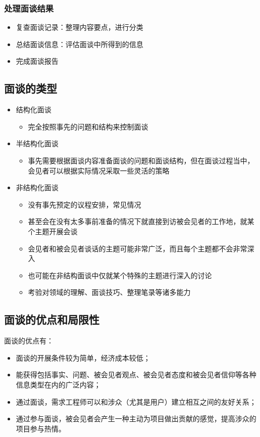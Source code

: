 \subsubsection{处理面谈结果}
\vspace{-0.8em}
\begin{multicols}{2}
    \begin{itemize}
        \item 复查面谈记录：整理内容要点，进行分类 
        \item 总结面谈信息：评估面谈中所得到的信息 
        \item 完成面谈报告
    \end{itemize}
\end{multicols}
\vspace{-1em}

\subsection{面谈的类型}
\begin{itemize}
    \item 结构化面谈
    \begin{itemize}
        \item 完全按照事先的问题和结构来控制面谈 
    \end{itemize}
    \item 半结构化面谈
    \begin{itemize}
        \item 事先需要根据面谈内容准备面谈的问题和面谈结构，但在面谈过程当中，会见者可以根据实际情况采取一些灵活的策略
    \end{itemize}
    \item 非结构化面谈 
    \begin{itemize}
        \item 没有事先预定的议程安排，常见情况
        \item 甚至会在没有太多事前准备的情况下就直接到访被会见者的工作地，就某个主题开展会谈
        \item 会见者和被会见者谈话的主题可能非常广泛，而且每个主题都不会非常深入
        \item 也可能在非结构面谈中仅就某个特殊的主题进行深入的讨论
        \item 考验对领域的理解、面谈技巧、整理笔录等诸多能力
    \end{itemize}
\end{itemize}

\subsection{面谈的优点和局限性}
面谈的优点有：
\begin{itemize}
    \item 面谈的开展条件较为简单，经济成本较低；
    \item 能获得包括事实、问题、被会见者观点、被会见者态度和被会见者信仰等各种信息类型在内的广泛内容；
    \item 通过面谈，需求工程师可以和涉众（尤其是用户）建立相互之间的友好关系；
    \item 通过参与面谈，被会见者会产生一种主动为项目做出贡献的感觉，提高涉众的项目参与热情。  
\end{itemize}

